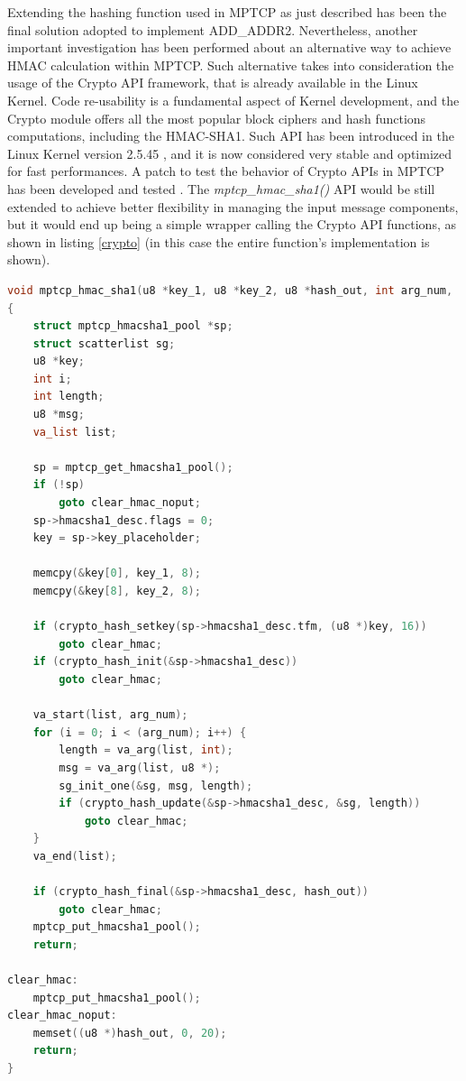Extending the hashing function used in MPTCP as just described has been the final solution adopted to implement ADD\_ADDR2. Nevertheless, another important investigation has been performed about an alternative way to achieve HMAC calculation within MPTCP. Such alternative takes into consideration the usage of the Crypto API framework, that is already available in the Linux Kernel. Code re-usability is a fundamental aspect of Kernel development, and the Crypto module offers all the most popular block ciphers and hash functions computations, including the HMAC-SHA1. Such API has been introduced in the Linux Kernel version 2.5.45 \cite{cryptoinkernel}, and it is now considered very stable and optimized for fast performances.
A patch to test the behavior of Crypto APIs in MPTCP has been developed and tested \cite{cryptopatch1} \cite{cryptopatch2}. The \textit{mptcp\_hmac\_sha1()} API would be still extended to achieve better flexibility in managing the input message components, but it would end up being a simple wrapper calling the Crypto API functions, as shown in listing \ref{crypto} (in this case the entire function's implementation is shown).

\begin{lstlisting}[language=c, caption=\textit{mptcp\_hmac\_sha1()} using Linux Kernel Crypto APIs, label=crypto]
void mptcp_hmac_sha1(u8 *key_1, u8 *key_2, u8 *hash_out, int arg_num, ...)
{
	struct mptcp_hmacsha1_pool *sp;
	struct scatterlist sg;
	u8 *key;
	int i;
	int length;
	u8 *msg;
	va_list list;

	sp = mptcp_get_hmacsha1_pool();
	if (!sp)
		goto clear_hmac_noput;
	sp->hmacsha1_desc.flags = 0;
	key = sp->key_placeholder;

	memcpy(&key[0], key_1, 8);
	memcpy(&key[8], key_2, 8);

	if (crypto_hash_setkey(sp->hmacsha1_desc.tfm, (u8 *)key, 16))
		goto clear_hmac;
	if (crypto_hash_init(&sp->hmacsha1_desc))
		goto clear_hmac;

	va_start(list, arg_num);
	for (i = 0; i < (arg_num); i++) {
		length = va_arg(list, int);
		msg = va_arg(list, u8 *);
		sg_init_one(&sg, msg, length);
		if (crypto_hash_update(&sp->hmacsha1_desc, &sg, length))
			goto clear_hmac;
	}
	va_end(list);

	if (crypto_hash_final(&sp->hmacsha1_desc, hash_out))
		goto clear_hmac;
	mptcp_put_hmacsha1_pool();
	return;

clear_hmac:
	mptcp_put_hmacsha1_pool();
clear_hmac_noput:
	memset((u8 *)hash_out, 0, 20);
	return;
}
\end{lstlisting}

